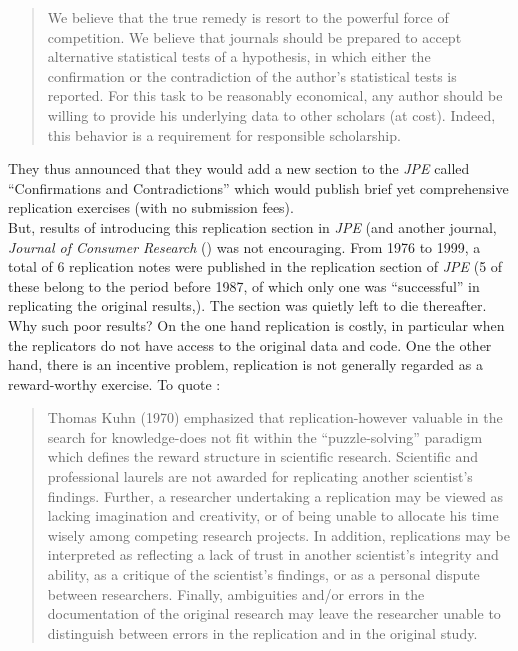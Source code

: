 \documentclass[11pt]{article}
\begin{document}
\begin{quotation}
  We believe that the true remedy is resort to the powerful force of competition. We believe that journals should be prepared to accept alternative statistical tests of a hypothesis, in which either the confirmation or the contradiction of the author's statistical tests is reported. For this task to be reasonably economical, any author should be willing to provide his underlying data to other scholars (at cost). Indeed, this behavior is a requirement for responsible scholarship.
\end{quotation}
They thus announced that they would add a new section to the \textit{JPE} called ``Confirmations and Contradictions'' which would publish brief yet comprehensive replication exercises (with no submission fees).\\

But, results of introducing this replication section in \textit{JPE} (and another journal, \textit{Journal of Consumer Research} (\cite{mayer1980economics}) was not encouraging. From 1976 to 1999, a total of 6 replication notes were published in the replication section of \textit{JPE} (5 of these belong to the period before 1987, of which only one was ``successful'' in replicating the original results,\cite{duvendack2015replications}). The section was quietly left to die thereafter.\\

Why such poor results? On the one hand replication is costly, in particular when the replicators do not have access to the original data and code. One the other hand, there is an incentive problem, replication is not generally regarded as a reward-worthy exercise. To quote \cite{dewald1986replication}:
\begin{quotation}
	Thomas Kuhn (1970) emphasized that replication-however valuable in the search for knowledge-does not fit within the
	``puzzle-solving'' paradigm which defines the reward structure in scientific research. Scientific and professional laurels are not awarded for replicating another scientist's findings.
	Further, a researcher undertaking a replication may be viewed as lacking imagination and creativity, or of being unable to allocate his time wisely among competing research projects. In addition, replications may be interpreted as reflecting a lack of trust in another scientist's integrity and ability, as a critique of the scientist's findings, or as a personal dispute between researchers. Finally, ambiguities and/or errors in the documentation of the original research may leave the researcher unable to distinguish between errors in the replication and in the original study.
\end{quotation}
\end{document}
